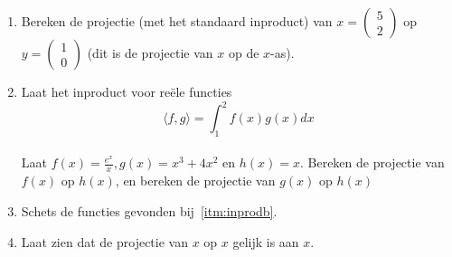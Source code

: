 \documentclass[../main.tex]{subfiles}
\begin{document}
\begin{opdrachtlang}\label{opd:hilbproj}
\begin{enumerate}
\item Bereken de projectie (met het standaard inproduct) van $x=\begin{pmatrix}5\\2\end{pmatrix}$ op $y=\begin{pmatrix}1\\0\end{pmatrix}$ (dit is de projectie van $x$ op de $x$-as).\\
\item\label{itm:inprodb} Laat het inproduct voor reële functies \[\langle f,g\rangle=\int_{1}^2 f(x)g(x)dx\]\\
Laat $f(x)=\frac{e^x}{x},g(x)=x^3+4x^2$ en $h(x)=x$. Bereken de projectie van $f(x)$ op $h(x)$, en bereken de projectie van $g(x)$ op $h(x)$\\
\item Schets de functies gevonden bij~\ref{itm:inprodb}.\\
\item Laat zien dat de projectie van $x$ op $x$ gelijk is aan $x$. 
\end{enumerate}
\end{opdrachtlang}
\end{document}
